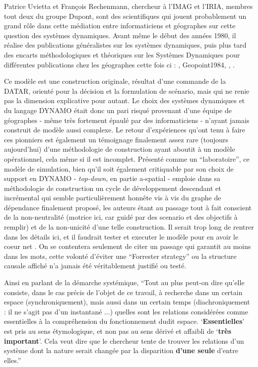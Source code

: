 Patrice Uvietta et François Rechenmann, chercheur à l'IMAG et l'IRIA, membres tout deux du groupe Dupont, sont des scientifiques qui jouent probablement un grand rôle dans cette médiation entre informaticiens et géographes sur cette question des systèmes dynamiques. Avant même le début des années 1980, il réalise des publications généralistes \autocite{Rechenmann1977} sur les systèmes dynamiques, puis plus tard des encarts méthodologiques et théoriques sur les Systèmes Dynamiques pour différentes publications chez les géographes cette fois ci : \autocite{Rechenmann1976}, Geopoint1984, \autocite{CGR1983}, \autocite{Guermond1984}.

Ce modèle est une construction originale, résultat d'une commande de la DATAR, orienté pour la décision et la formulation de scénario, mais qui ne renie pas la dimension explicative pour autant. Le choix des systèmes dynamiques et du langage DYNAMO était donc un pari risqué provenant d'une équipe de géographes - même très fortement épaulé par des informaticiens - n'ayant jamais construit de modèle aussi complexe. Le retour d'expériences qu'ont tenu à faire ces pionniers est également un témoignage finalement assez rare (toujours aujourd'hui) d'une méthodologie de construction ayant aboutit à un modèle opérationnel, cela même si il est incomplet. Présenté comme un \enquote{laboratoire}, ce modèle de simulation, bien qu'il soit également critiquable par son choix de support en DYNAMO - \textit{top-down}, en partie a-spatial - emploie dans sa méthodologie de construction un cycle de développement descendant et incrémental qui semble particulièrement honnête vis à vis du graphe de dépendance finalement proposé, les auteurs étant au passage tout à fait conscient de la non-neutralité (motrice ici, car guidé par des scenario et des objectifs à remplir) et de la non-unicité d'une telle construction. Il serait trop long de rentrer dans les détails ici, et il faudrait tester et executer le modèle pour en avoir le coeur net . On se contentera seulement de citer un passage qui garantit au moins dans les mots, cette volonté d'éviter une \foreignquote{english}{Forrester strategy} \autocite[7-8]{Batty2001} ou la structure causale affiché n'a jamais été véritablement justifié ou testé.

Ainsi en parlant de la démarche systémique, \enquote{Tout au plus peut-on dire qu'elle consiste, dans le cas précis de l'objet de ce travail, à recherche dans un certain espace (synchroniquement), mais aussi dans un certain temps (diachroniquement : il ne s'agit pas d'un instantané ...) quelles sont les relations considérées comme essentielles à la compréhension du fonctionnement dudit espace. \enquote{\textbf{Essentielles}} est pris au sens étymologique, et non pas au sens dérivé et affaibli de \enquote{\textbf{très important}}. Cela veut dire que le chercheur tente de trouver les relations d'un système dont la nature serait changée par la disparition \textbf{d'une seule} d'entre elles.} \autocite{AMORAL1983}

